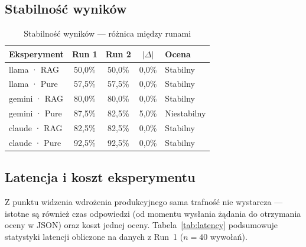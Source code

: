 \documentclass[12pt, a4paper]{article}
\begin{document}
\subsection{Stabilność wyników}

\begin{table}[H]
    \centering
    \caption{Stabilność wyników — różnica między runami}
    \label{tab:stability}
    \begin{tabular}{@{}lcccl@{}}
        \toprule
        \textbf{Eksperyment} & \textbf{Run 1} & \textbf{Run 2}
            & \textbf{$|\Delta|$} & \textbf{Ocena} \\
        \midrule
        llama · RAG        & 50,0\% & 50,0\% & 0,0\% & Stabilny \\
        llama · Pure       & 57,5\% & 57,5\% & 0,0\% & Stabilny \\
        gemini · RAG       & 80,0\% & 80,0\% & 0,0\% & Stabilny \\
        gemini · Pure      & 87,5\% & 82,5\% & 5,0\% & Niestabilny \\
        claude · RAG       & 82,5\% & 82,5\% & 0,0\% & Stabilny \\
        claude · Pure      & 92,5\% & 92,5\% & 0,0\% & Stabilny \\
        \bottomrule
    \end{tabular}
\end{table}

\subsection{Latencja i koszt eksperymentu}

Z punktu widzenia wdrożenia produkcyjnego sama trafność nie wystarcza —
istotne są również czas odpowiedzi (od momentu wysłania żądania do otrzymania
oceny w JSON) oraz koszt jednej oceny. Tabela~\ref{tab:latency} podsumowuje
statystyki latencji obliczone na danych z Run~1 ($n=40$ wywołań).
\end{document}
